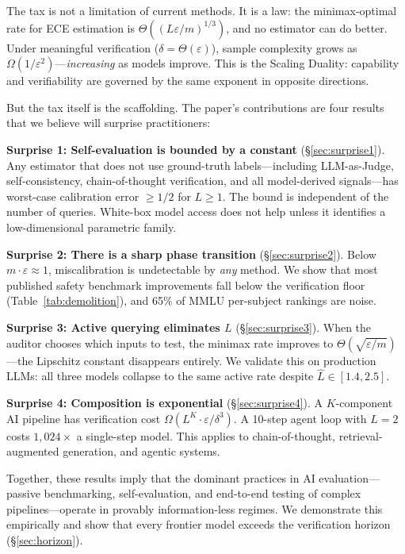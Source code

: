 \documentclass{article}
\newcommand{\Lip}{L}
\newcommand{\errrate}{\varepsilon}
\newcommand{\nsamples}{m}
\newcommand{\targetacc}{\delta}
\theoremstyle{definition}
\begin{document}
The tax is not a limitation of current methods. It is a law: the minimax-optimal rate for ECE estimation is $\Theta((\Lip\errrate/\nsamples)^{1/3})$, and no estimator can do better. Under meaningful verification ($\targetacc = \Theta(\errrate)$), sample complexity grows as $\Omega(1/\errrate^2)$---\emph{increasing} as models improve. This is the Scaling Duality: capability and verifiability are governed by the same exponent in opposite directions.

But the tax itself is the scaffolding. The paper's contributions are four results that we believe will surprise practitioners:

\textbf{Surprise 1: Self-evaluation is bounded by a constant} (\S\ref{sec:surprise1}). Any estimator that does not use ground-truth labels---including LLM-as-Judge, self-consistency, chain-of-thought verification, and all model-derived signals---has worst-case calibration error $\geq 1/2$ for $\Lip \geq 1$. The bound is independent of the number of queries. White-box model access does not help unless it identifies a low-dimensional parametric family.

\textbf{Surprise 2: There is a sharp phase transition} (\S\ref{sec:surprise2}). Below $\nsamples \cdot \errrate \approx 1$, miscalibration is undetectable by \emph{any} method. We show that most published safety benchmark improvements fall below the verification floor (Table~\ref{tab:demolition}), and 65\% of MMLU per-subject rankings are noise.

\textbf{Surprise 3: Active querying eliminates $\Lip$} (\S\ref{sec:surprise3}). When the auditor chooses which inputs to test, the minimax rate improves to $\Theta(\sqrt{\errrate/\nsamples})$---the Lipschitz constant disappears entirely. We validate this on production LLMs: all three models collapse to the same active rate despite $\hat{\Lip} \in [1.4, 2.5]$.

\textbf{Surprise 4: Composition is exponential} (\S\ref{sec:surprise4}). A $K$-component AI pipeline has verification cost $\Omega(\Lip^K \cdot \errrate/\targetacc^3)$. A 10-step agent loop with $\Lip=2$ costs $1{,}024\times$ a single-step model. This applies to chain-of-thought, retrieval-augmented generation, and agentic systems.

Together, these results imply that the dominant practices in AI evaluation---passive benchmarking, self-evaluation, and end-to-end testing of complex pipelines---operate in provably information-less regimes. We demonstrate this empirically and show that every frontier model exceeds the verification horizon (\S\ref{sec:horizon}).
\end{document}
